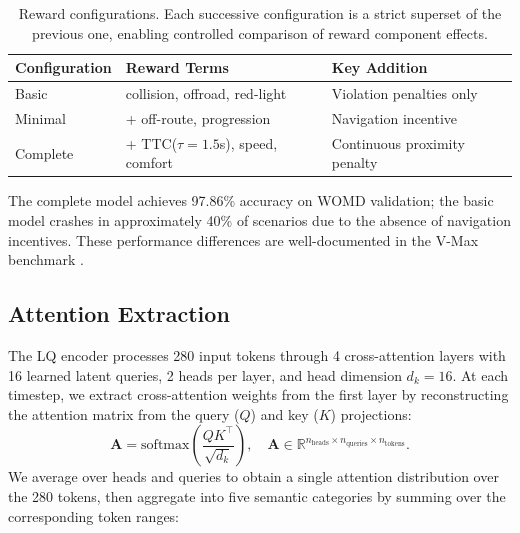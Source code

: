 \documentclass[10pt]{article} %
\begin{document}
\begin{table}[ht]
    \caption{Reward configurations. Each successive configuration is a strict superset of the previous one, enabling controlled comparison of reward component effects.}
    \label{tab:rewards}
    \begin{center}
    \begin{tabular}{llp{5.5cm}}
        \toprule
        \textbf{Configuration} & \textbf{Reward Terms} & \textbf{Key Addition} \\
        \midrule
        Basic & collision, offroad, red-light & Violation penalties only \\
        Minimal & + off-route, progression & Navigation incentive \\
        Complete & + TTC($\tau{=}1.5$s), speed, comfort & Continuous proximity penalty \\
        \bottomrule
    \end{tabular}
    \end{center}
\end{table}

The complete model achieves 97.86\% accuracy on WOMD validation; the basic model crashes in approximately 40\% of scenarios due to the absence of navigation incentives. These performance differences are well-documented in the V-Max benchmark \citep{charraut2025vmax}.

\subsection{Attention Extraction}
\label{sec:attention}

The LQ encoder processes 280 input tokens through 4 cross-attention layers with 16 learned latent queries, 2 heads per layer, and head dimension $d_k{=}16$. At each timestep, we extract cross-attention weights from the first layer by reconstructing the attention matrix from the query ($Q$) and key ($K$) projections:
\begin{equation}
    \mathbf{A} = \mathrm{softmax}\!\left(\frac{QK^\top}{\sqrt{d_k}}\right), \quad \mathbf{A} \in \mathbb{R}^{n_\mathrm{heads} \times n_\mathrm{queries} \times n_\mathrm{tokens}}.
\end{equation}
We average over heads and queries to obtain a single attention distribution over the 280 tokens, then aggregate into five semantic categories by summing over the corresponding token ranges:
\end{document}
